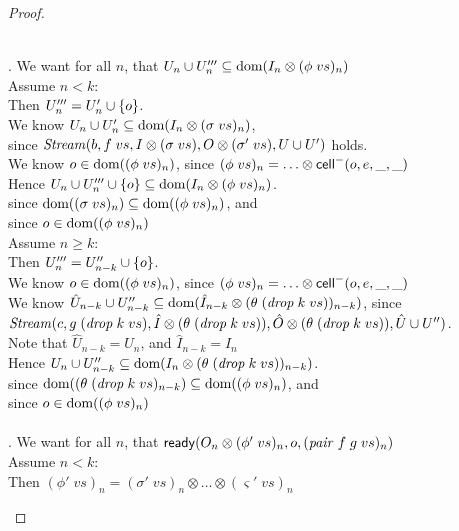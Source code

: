 \begin{proof}
\begin{enumerate}
\begin{tabbedproof}
  \\ . We want for all $n$, that $U_n \cup U'''_n \subseteq \mbox{dom}({I_n \otimes (\phi\;vs)_n})$ \\
  \ooo Assume $n < k$: \\
  \oooo Then $U'''_n = U'_n \cup \{{o}\}$. \\
  \oooo We know $U_n \cup U'_n \subseteq \mbox{dom}({I_n \otimes (\sigma\;vs)_n})$, \\
  \oooox since  $\mathit{Stream}(b, f\;vs, I \otimes (\sigma\;vs), O \otimes (\sigma'\;vs), U \cup U')$ holds. \\ 
  \oooo We know $o \in \mbox{dom}({(\phi\;vs)_n})$, since $(\phi\;vs)_n = \ldots \otimes \mathsf{cell}^{-}({o}, {e}, {\_}, {\_})$ \\ 
  \oooo Hence $U_n \cup U'''_n \cup \{{o}\} \subseteq \mbox{dom}({I_n \otimes (\phi\;vs)_n})$. \\
  \oooox since $\mbox{dom}({(\sigma\;vs)_n}) \subseteq \mbox{dom}({(\phi\;vs)_n})$, and \\
  \oooox since $o \in  \mbox{dom}({(\phi\;vs)_n})$ \\
  \ooo Assume $n \geq k$: \\
  \oooo Then $U'''_n = U''_{n-k} \cup \{{o}\}$. \\
  \oooo We know $o \in \mbox{dom}({(\phi\;vs)_n})$, since $(\phi\;vs)_n = \ldots \otimes \mathsf{cell}^{-}({o}, {e}, {\_}, {\_})$ \\ 
  \oooo We know $\hat{U}_{n-k} \cup U''_{n-k} \subseteq \mbox{dom}({\hat{I}_{n-k} \otimes (\theta\;(\mathit{drop}\;k\;vs))_{n-k}})$, since \\
  \oooox  $\mathit{Stream}(c, g\;(\mathit{drop}\;k\;vs), \hat{I} \otimes (\theta\;(\mathit{drop}\;k\;vs)), \hat{O} \otimes (\theta\;(\mathit{drop}\;k\;vs)), \hat{U} \cup U'')$. \\ 
  \oooo Note that $\hat{U}_{n-k} = U_n$, and $\hat{I}_{n-k} = I_n$ \\ 
  \oooo Hence $U_n \cup U''_{n-k} \subseteq \mbox{dom}({I_n \otimes (\theta\;(\mathit{drop}\;k\;vs))_{n-k}})$.  \\
  \oooox since $\mbox{dom}({(\theta\;(\mathit{drop}\;k\;vs)_{n-k}}) \subseteq \mbox{dom}({(\phi\;vs)_n})$, and \\
  \oooox since $o \in  \mbox{dom}({(\phi\;vs)_n})$ \\
  \\ . We want for all $n$, that $\mathsf{ready}({O_n \otimes (\phi'\;vs)_n}, {o}, {(\mathit{pair}\;f\;g\;vs)_n})$ \\
  \ooo Assume $n < k$:\\
  \oooo Then $(\phi'\;vs)_n = (\sigma'\;vs)_n \otimes \ldots \otimes (\varsigma'\;vs)_n$ \\

\end{tabbedproof}
\end{enumerate}
\end{proof}
